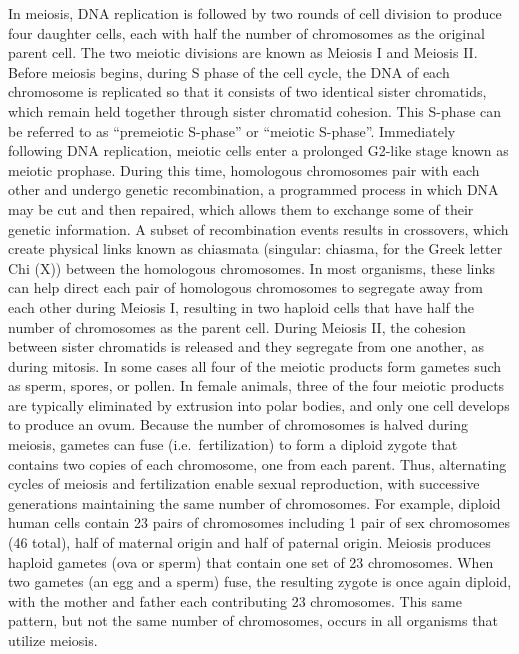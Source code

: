 In meiosis, DNA replication is followed by two rounds of cell division to produce four daughter cells, each with half the number of chromosomes as the original parent cell. The two meiotic divisions are known as Meiosis I and Meiosis II. Before meiosis begins, during S phase of the cell cycle, the DNA of each chromosome is replicated so that it consists of two identical sister chromatids, which remain held together through sister chromatid cohesion. This S-phase can be referred to as ``premeiotic S-phase'' or ``meiotic S-phase''. Immediately following DNA replication, meiotic cells enter a prolonged G2-like stage known as meiotic prophase. During this time, homologous chromosomes pair with each other and undergo genetic recombination, a programmed process in which DNA may be cut and then repaired, which allows them to exchange some of their genetic information. A subset of recombination events results in crossovers, which create physical links known as chiasmata (singular: chiasma, for the Greek letter Chi (X)) between the homologous chromosomes. In most organisms, these links can help direct each pair of homologous chromosomes to segregate away from each other during Meiosis I, resulting in two haploid cells that have half the number of chromosomes as the parent cell. During Meiosis II, the cohesion between sister chromatids is released and they segregate from one another, as during mitosis. In some cases all four of the meiotic products form gametes such as sperm, spores, or pollen. In female animals, three of the four meiotic products are typically eliminated by extrusion into polar bodies, and only one cell develops to produce an ovum. Because the number of chromosomes is halved during meiosis, gametes can fuse (i.e.~fertilization) to form a diploid zygote that contains two copies of each chromosome, one from each parent. Thus, alternating cycles of meiosis and fertilization enable sexual reproduction, with successive generations maintaining the same number of chromosomes. For example, diploid human cells contain 23 pairs of chromosomes including 1 pair of sex chromosomes (46 total), half of maternal origin and half of paternal origin. Meiosis produces haploid gametes (ova or sperm) that contain one set of 23 chromosomes. When two gametes (an egg and a sperm) fuse, the resulting zygote is once again diploid, with the mother and father each contributing 23 chromosomes. This same pattern, but not the same number of chromosomes, occurs in all organisms that utilize meiosis.


